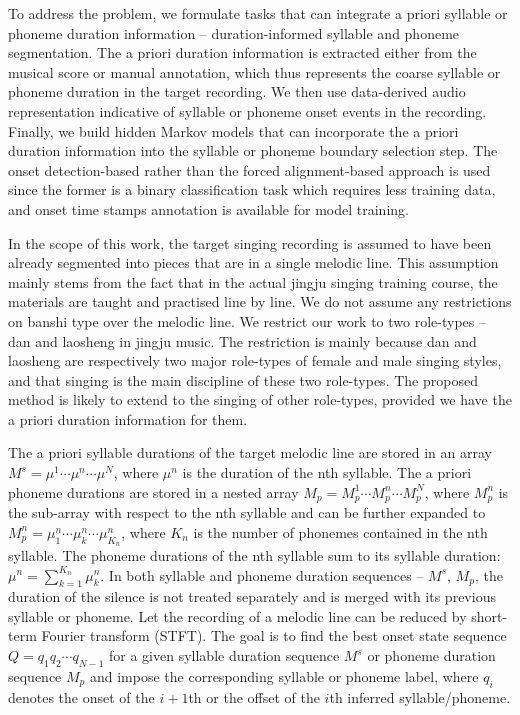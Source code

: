 To address the problem, we formulate tasks that can integrate a priori syllable or phoneme duration information -- duration-informed syllable and phoneme segmentation. The a priori duration information is extracted either from the musical score or manual annotation, which thus represents the coarse syllable or phoneme duration in the target recording. We then use data-derived audio representation indicative of syllable or phoneme onset events in the recording. Finally, we build hidden Markov models that can incorporate the a priori duration information into the syllable or phoneme boundary selection step. The onset detection-based rather than the forced alignment-based approach is used since the former is a binary classification task which requires less training data, and onset time stamps annotation is available for model training.

In the scope of this work, the target singing recording is assumed to have been already segmented into pieces that are in a single melodic line. This assumption mainly stems from the fact that in the actual jingju singing training course, the materials are taught and practised line by line. We do not assume any restrictions on banshi type over the melodic line. We restrict our work to two role-types -- dan and laosheng in jingju music. The restriction is mainly because dan and laosheng are respectively two major role-types of female and male singing styles, and that singing is the main discipline of these two role-types. The proposed method is likely to extend to the singing of other role-types, provided we have the a priori duration information for them. 

The a priori syllable durations of the target melodic line are stored in an array $M^s=\mu^{1} \cdots \mu^{n} \cdots \mu^{N}$, where $\mu^{n}$ is the duration of the nth syllable. The a priori phoneme durations are stored in a nested array $M_p=M^{1}_p \cdots M^{n}_p \cdots M^{N}_p$, where $M^{n}_p$ is the sub-array with respect to the nth syllable and can be further expanded to $M^{n}_p=\mu_{1}^{n} \cdots \mu_{k}^{n} \cdots \mu_{K_{n}}^{n}$, where $K_{n}$ is the number of phonemes contained in the nth syllable. The phoneme durations of the nth syllable sum to its syllable duration: $\mu^{n}=\sum_{k=1}^{K_{n}} \mu_k^{n}$. In both syllable and phoneme duration sequences -- $M^s$, $M_p$, the duration of the silence is not treated separately and is merged with its previous syllable or phoneme. Let the recording of a melodic line can be reduced by short-term Fourier transform (STFT). The goal is to find the best onset state sequence $Q={q_1 q_2 \cdots q_{N-1}}$ for a given syllable duration sequence $M^s$ or phoneme duration sequence $M_p$ and impose the corresponding syllable or phoneme label, where $q_i$ denotes the onset of the $i+1$th or the offset of the $i$th inferred syllable/phoneme.

